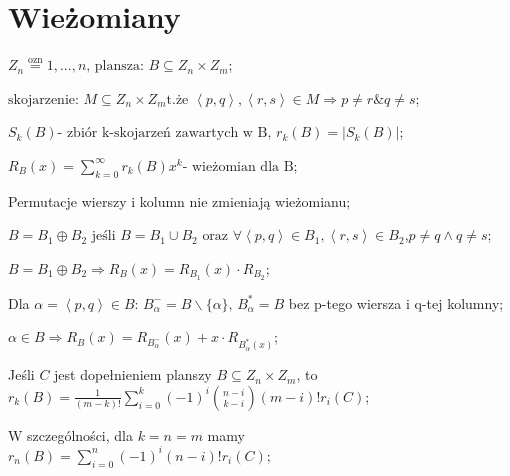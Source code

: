 \section{Wieżomiany}

\entry
$Z_n \stackrel{\text{ozn}}{=} {1,...,n}\text{, plansza: }B \subseteq Z_n\times Z_m$;

\entry
$\text{skojarzenie: } M \subseteq Z_n \times Z_m \text{t.że }\left\langle p,q \right\rangle , \left\langle r,s\right\rangle \in M \Rightarrow p \neq r \& q \neq s$;

\entry
$S_k(B) \text{- zbiór k-skojarzeń zawartych w B, }r_k(B) = |S_k(B)|$;

\entry
$R_B(x) = \sum_{k=0}^{\infty}r_k(B)x^k \text{- wieżomian dla B}$;

\entry
Permutacje wierszy i kolumn nie zmieniają wieżomianu;

\entry
$B = B_1 \oplus B_2 \text{ jeśli } B=B_1 \cup B_2 \text{ oraz } \forall \left\langle p,q\right\rangle \in B_1,\left\langle r,s\right\rangle \in B_2 \text{,} p\neq q \wedge q\neq s $;

\entry
$B = B_1\oplus B_2 \Rightarrow R_B(x) = R_{B_1}(x) \cdot R_{B_2}$;

\entry
Dla $\alpha = \left\langle p, q\right\rangle \in B$: $ B_\alpha^- = B \backslash \{\alpha\}\text{, } B_\alpha^* = B$ bez p-tego wiersza i q-tej kolumny;

\entry
$\alpha \in B \Rightarrow R_B(x) = R_{B_\alpha^-}(x) + x \cdot R_{B_\alpha^*(x)}$;

\entry
Jeśli $C$ jest dopełnieniem planszy $B \subseteq Z_n \times Z_m$, to \\ $r_k(B)=\frac{1}{(m-k)!}\sum_{i=0}^k(-1)^i\binom{n-i}{k-i}(m-i)!r_i(C)$;

\entry
W szczególności, dla $k=n=m$ mamy \\
$r_n(B) = \sum_{i=0}^n(-1)^i(n-i)!r_i(C)$;
